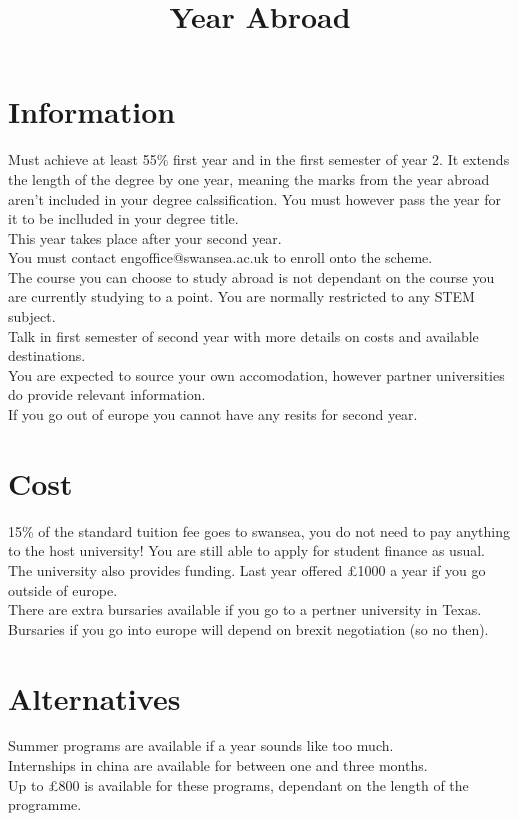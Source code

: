 \documentclass[12pt,a4paper]{article}
\begin{document}
\title{Year Abroad}
\date{}
\maketitle

\newpage

\tableofcontents

\newpage

\section{Information}
    Must achieve at least 55\% first year and in the first semester of year 2. It extends the length of the degree by one year, meaning the marks from the year abroad aren't included in your degree calssification. You must however pass the year for it to be inclluded in your degree title. \\
    This year takes place after your second year. \\
    You must contact engoffice@swansea.ac.uk to enroll onto the scheme. \\
    The course you can choose to study abroad is not dependant on the course you are currently studying to a point. You are normally restricted to any STEM subject. \\
    Talk in first semester of second year with more details on costs and available destinations. \\
    You are expected to source your own accomodation, however partner universities do provide relevant information. \\
    If you go out of europe you cannot have any resits for second year.

\section{Cost}
    15\% of the standard tuition fee goes to swansea, you do not need to pay anything to the host university! You are still able to apply for student finance as usual. \\
    The university also provides funding. Last year offered £1000 a year if you go outside of europe. \\
    There are extra bursaries available if you go to a pertner university in Texas. \\
    Bursaries if you go into europe will depend on brexit negotiation (so no then). \\

\section{Alternatives}
    Summer programs are available if a year sounds like too much. \\
    Internships in china are available for between one and three months. \\
    Up to £800 is available for these programs, dependant on the length of the programme. 
\end{document}
